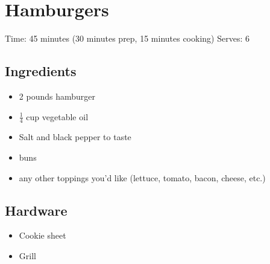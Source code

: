 \section{Hamburgers}
\label{hamburgers}
\setcounter{secnumdepth}{0}
Time: 45 minutes (30 minutes prep, 15 minutes cooking)
Serves: 6

\begin{multicols}{2}
\subsection*{Ingredients}
\begin{itemize}
    \item 2 pounds hamburger
    \item \( \frac{1}{4} \) cup vegetable oil
    \item Salt and black pepper to taste
    \item buns
    \item any other toppings you'd like (lettuce, tomato, bacon, cheese, etc.)
\end{itemize}

\subsection*{Hardware}
\begin{itemize}
    \item Cookie sheet
    \item Grill
\end{itemize}
\clearpage


\end{multicols}
